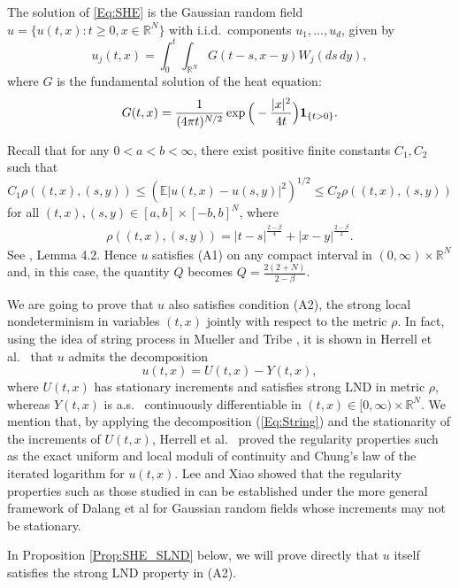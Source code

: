 \documentclass[11pt, reqno]{amsart}
\def\R{{\mathbb R}}
\def\E{{\mathbb E}}
\numberwithin{equation}{section}
\begin{document}
The solution of \eqref{Eq:SHE} is the Gaussian random field $u = \{u(t, x) : t \ge 0, x \in \R^N\}$ with i.i.d.~components 
$u_1, \dots, u_d$, given by
\[ u_j(t, x) = \int_0^t \int_{\R^N} G(t-s, x-y) W_j(ds\, dy), \]
where $G$ is the fundamental solution of the heat equation:
\[ G(t, x) = \frac{1}{(4\pi t)^{N/2}} \exp\Big(-\frac{|x|^2}{4t}\Big) {\bf 1}_{\{t > 0\}}. \]


Recall that for any $0 < a < b < \infty$, there exist positive finite constants $C_1, C_2$ such that
\begin{equation}\label{Eq:SHE_incre}
C_1 \rho((t, x), (s, y)) \le (\E|u(t, x) - u(s, y)|^2)^{1/2} \le C_2 \rho((t, x), (s, y))
\end{equation}
for all $(t, x), (s, y) \in [a, b] \times [-b,b]^N$, where
\begin{align}\label{rho}
\rho((t, x), (s, y)) = |t-s|^{\frac{2-\beta}{4}} + |x-y|^{\frac{2-\beta}{2}}.
\end{align}
See \cite{DKN07}, Lemma 4.2.
Hence $u$ satisfies (A1) on any compact interval in $(0, \infty) \times \R^N$ and, in this case, the quantity $Q$ becomes
$Q = \frac{2(2+N)}{2 -\beta}$.

We are going to prove that $u$ also satisfies condition (A2), the strong local nondeterminism in variables $(t, x)$ jointly 
with respect to the metric $\rho$. In fact, using the idea of string process in Mueller and Tribe \cite{MT02}, it is shown 
in Herrell et al.~\cite{HSWX} that $u$ admits the decomposition
\begin{equation} \label{Eq:String}
u(t, x) = U(t, x) - Y(t, x),
\end{equation}
where $U(t, x)$ has stationary increments and satisfies strong LND in metric $\rho$, whereas $Y(t, x)$ is a.s.
~continuously differentiable in $(t, x) \in [0, \infty)\times \R^N$. We mention that, by applying the decomposition 
(\ref{Eq:String}) and the stationarity of the increments of $U(t, x)$, Herrell et al.~\cite{HSWX} proved the regularity 
properties such as the exact uniform and local moduli of continuity and Chung's law of the iterated logarithm for 
$u(t, x)$. Lee and Xiao \cite{LeeX21} showed that the regularity properties such as those studied in \cite{HSWX}
can be established under the more general framework of Dalang et al \cite{DMX17} for Gaussian random fields whose 
increments may not be stationary.

In Proposition \ref{Prop:SHE_SLND} below, we will prove directly that $u$ itself satisfies the strong 
LND property in (A2). 
\end{document}
